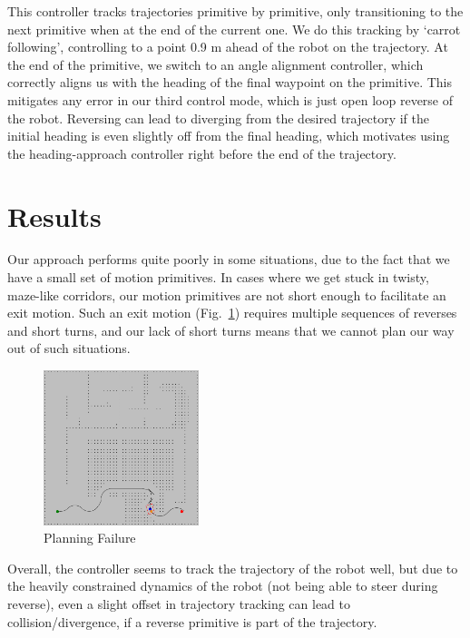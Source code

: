 \documentclass{article}
\begin{document}
This controller tracks trajectories primitive by primitive, only transitioning to the next primitive when at the end of the current one. We do this tracking by `carrot following', controlling to a point 0.9 m ahead of the robot on the trajectory. At the end of the primitive, we switch to an angle alignment controller, which correctly aligns us with the heading of the final waypoint on the primitive. This mitigates any error in our third control mode, which is just open loop reverse of the robot. Reversing can lead to diverging from the desired trajectory if the initial heading is even slightly off from the final heading, which motivates using the heading-approach controller right before the end of the trajectory.

\section{Results}


Our approach performs quite poorly in some situations, due to the fact that we have a small set of motion primitives. In cases where we get stuck in twisty, maze-like corridors, our motion primitives are not short enough to facilitate an exit motion. Such an exit motion (Fig.~\ref{fig:stuck}) requires multiple sequences of reverses and short turns, and our lack of short turns means that we cannot plan our way out of such situations.

\begin{figure}[!]
\centering
\includegraphics[width=128pt,keepaspectratio]{stuck_in_map2_S.png}
\caption{Planning Failure}
\label{fig:stuck}
\end{figure}

Overall, the controller seems to track the trajectory of the robot well, but due to the heavily constrained dynamics of the robot (not being able to steer during reverse), even a slight offset in trajectory tracking can lead to collision/divergence, if a reverse primitive is part of the trajectory.
\end{document}
